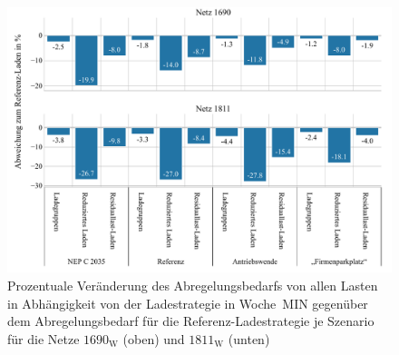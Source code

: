 \begin{figure}[H]
    \centering
    \includegraphics[width=\textwidth]{Bilder/1690_1811_cur_load_grid_week_A}
    \caption[Prozentuale Veränderung des Abregelungsbedarfs von allen Lasten in Abhängigkeit von der Ladestrategie in Woche~MIN gegenüber dem Abregelungsbedarf für die Referenz-Ladestrategie je Szenario für die Netze \num{1690} und \num{1811}]{Prozentuale Veränderung des Abregelungsbedarfs von allen Lasten in Abhängigkeit von der Ladestrategie in Woche~MIN gegenüber dem Abregelungsbedarf für die Referenz-Ladestrategie je Szenario für die Netze \(1690_{\text{W}}\) (oben) und \(1811_{\text{W}}\) (unten)}\label{fig:1690_1811_cur_load_grid_week_A}
\end{figure}